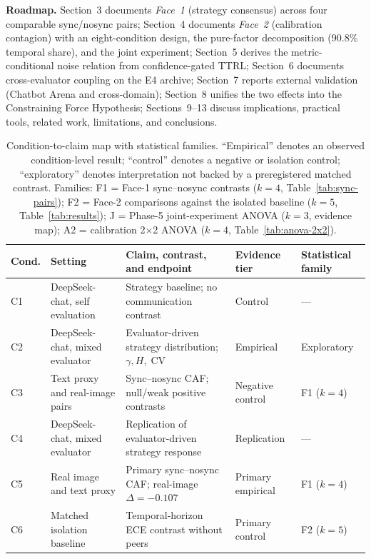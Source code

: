 \documentclass[11pt]{article}
\DeclareMathOperator{\CV}{CV}
\begin{document}
\noindent\textbf{Roadmap.} Section~3 documents \textit{Face~1} (strategy consensus) across four comparable sync/nosync pairs; Section~4 documents \textit{Face~2} (calibration contagion) with an eight-condition design, the pure-factor decomposition (90.8\% temporal share), and the joint experiment; Section~5 derives the metric-conditional noise relation from confidence-gated TTRL; Section~6 documents cross-evaluator coupling on the E4 archive; Section~7 reports external validation (Chatbot Arena and cross-domain); Section~8 unifies the two effects into the Constraining Force Hypothesis; Sections~9--13 discuss implications, practical tools, related work, limitations, and conclusions.

\begin{table}[t]
\centering
\caption{Condition-to-claim map with statistical families. ``Empirical'' denotes an observed condition-level result; ``control'' denotes a negative or isolation control; ``exploratory'' denotes interpretation not backed by a preregistered matched contrast. Families: F1 = Face-1 sync--nosync contrasts ($k{=}4$, Table~\ref{tab:sync-pairs}); F2 = Face-2 comparisons against the isolated baseline ($k{=}5$, Table~\ref{tab:results}); J = Phase-5 joint-experiment ANOVA ($k{=}3$, evidence map); A2 = calibration 2$\times$2 ANOVA ($k{=}4$, Table~\ref{tab:anova-2x2}).}
\label{tab:cond-overview}
\small
\begin{tabularx}{\textwidth}{@{}l p{} X p{} p{}@{}}
\toprule
\textbf{Cond.} & \textbf{Setting} & \textbf{Claim, contrast, and endpoint} & \textbf{Evidence tier} & \textbf{Statistical family} \\
\midrule
C1 & DeepSeek-chat, self evaluation & Strategy baseline; no communication contrast & Control & --- \\
C2 & DeepSeek-chat, mixed evaluator & Evaluator-driven strategy distribution; $\gamma,H,\CV$ & Empirical & Exploratory \\
C3 & Text proxy and real-image pairs & Sync--nosync CAF; null/weak positive contrasts & Negative control & F1 ($k{=}4$) \\
C4 & DeepSeek-chat, mixed evaluator & Replication of evaluator-driven strategy response & Replication & --- \\
C5 & Real image and text proxy & Primary sync--nosync CAF; real-image $\Delta=-0.107$ & Primary empirical & F1 ($k{=}4$) \\
C6 & Matched isolation baseline & Temporal-horizon ECE contrast without peers & Primary control & F2 ($k{=}5$) \\

\end{tabularx}
\end{table}
\end{document}
